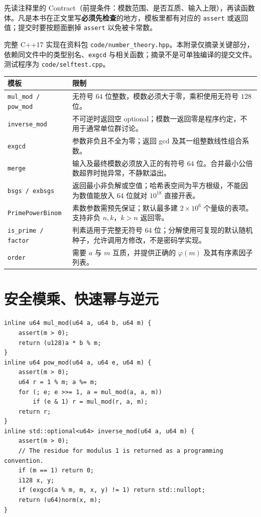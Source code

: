\documentclass[UTF8,a4paper,11pt,twoside,openright,fontset=fandol]{ctexbook}
\theoremstyle{definition}
\begin{document}
\begin{tip}[附录代码怎么读]
先读注释里的 Contract（前提条件：模数范围、是否互质、输入上限），再读函数体。凡是本书在正文里写\textbf{必须先检查}的地方，模板里都有对应的 \texttt{assert} 或返回值；提交时要按题面删掉 \texttt{assert} 以免被卡常数。
\end{tip}

完整 C++17 实现在资料包 \texttt{code/number\_theory.hpp}。本附录仅摘录关键部分，依赖同文件中的类型别名、\texttt{exgcd} 与相关函数；摘录不是可单独编译的提交文件。测试程序为 \texttt{code/selftest.cpp}。

\begin{longtable}{p{}p{}}
\toprule
模板 & 限制\\\midrule
\texttt{mul\_mod / pow\_mod} & 无符号 $64$ 位整数，模数必须大于零，乘积使用无符号 $128$ 位。\\
\texttt{inverse\_mod} & 不可逆时返回空 optional；模数一返回零是程序约定，不用于通常单位群讨论。\\
\texttt{exgcd} & 参数非负且不全为零；返回 gcd 及其一组整数线性组合系数。\\
\texttt{merge} & 输入及最终模数必须放入正的有符号 $64$ 位。合并最小公倍数超界时抛异常，不静默溢出。\\
\texttt{bsgs / exbsgs} & 返回最小非负解或空值；哈希表空间为平方根级，不能因为数值能放入 $64$ 位就对 $10^{18}$ 直接开表。\\
\texttt{PrimePowerBinom} & 素数参数需预先保证；默认最多建 $2\times10^6$ 个量级的表项。支持非负 $n,k$，$k>n$ 返回零。\\
\texttt{is\_prime / factor} & 判素适用于完整无符号 $64$ 位；分解使用可复现的默认随机种子，允许调用方修改，不是密码学实现。\\
\texttt{order} & 需要 $a$ 与 $m$ 互质，并提供正确的 $\varphi(m)$ 及其有序素因子列表。\\
\bottomrule
\end{longtable}

\section{安全模乘、快速幂与逆元}
\begin{lstlisting}
inline u64 mul_mod(u64 a, u64 b, u64 m) {
    assert(m > 0);
    return (u128)a * b % m;
}
inline u64 pow_mod(u64 a, u64 e, u64 m) {
    assert(m > 0);
    u64 r = 1 % m; a %= m;
    for (; e; e >>= 1, a = mul_mod(a, a, m))
        if (e & 1) r = mul_mod(r, a, m);
    return r;
}
inline std::optional<u64> inverse_mod(u64 a, u64 m) {
    assert(m > 0);
    // The residue for modulus 1 is returned as a programming convention.
    if (m == 1) return 0;
    i128 x, y;
    if (exgcd(a % m, m, x, y) != 1) return std::nullopt;
    return (u64)norm(x, m);
}
\end{lstlisting}
\end{document}
